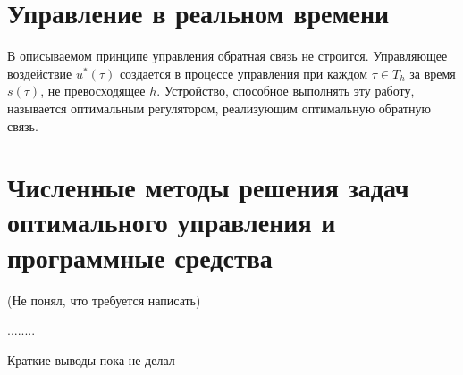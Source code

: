 \section{Управление в реальном времени}\label{1_3}


%
%
%
%
%
%
%
%
%
%


В описываемом принципе управления обратная связь не строится. Управляющее воздействие $ u^*(\tau) $ создается в процессе управления при каждом $ \tau \in T_h $ за время $ s(\tau)$, не превосходящее $h$. Устройство, способное выполнять эту работу, называется оптимальным регулятором, реализующим оптимальную обратную связь. 


\section{Численные методы решения задач оптимального управления и программные средства}
(Не понял, что требуется написать)



........

\bigskip
Краткие выводы пока не делал 
